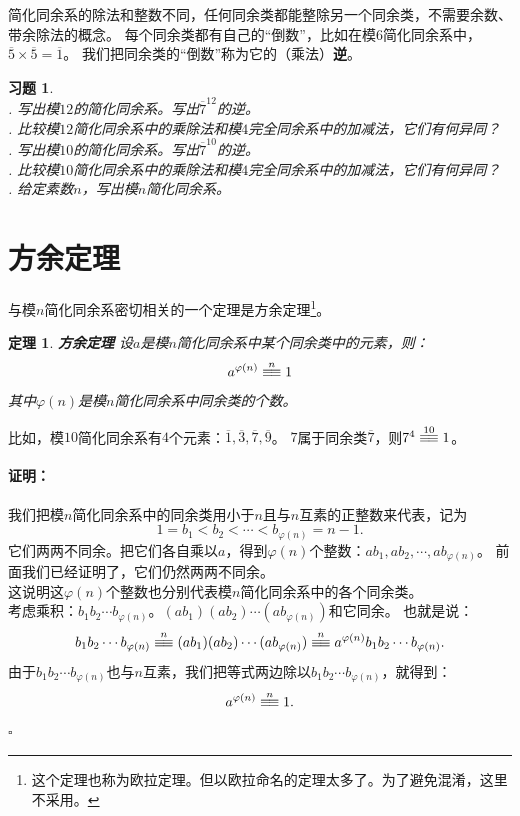 \documentclass[12pt,UTF8]{ctexbook}
\newtheorem{tm}{定理}[section]
\newtheorem{xt}{习题}[section]
\renewenvironment{proof}{\paragraph{\textbf{证明：}}}{\hfill$\square$}
\newcommand{\tong}[1]{\overset{#1}{\equiv\joinrel\equiv}}
\begin{document}
简化同余系的除法和整数不同，任何同余类都能整除另一个同余类，不需要余数、带余除法的概念。
每个同余类都有自己的“倒数”，比如在模$6$简化同余系中，$\overline{5}\times\overline{5} = \overline{1}$。
我们把同余类的“倒数”称为它的（乘法）\textbf{逆}。

\begin{xt}
    \mbox{}\\
    . 写出模$12$的简化同余系。写出$\overline{7}^{12}$的逆。\\
    . 比较模$12$简化同余系中的乘除法和模$4$完全同余系中的加减法，它们有何异同？\\
    . 写出模$10$的简化同余系。写出$\overline{7}^{10}$的逆。\\
    . 比较模$10$简化同余系中的乘除法和模$4$完全同余系中的加减法，它们有何异同？\\
    . 给定素数$n$，写出模$n$简化同余系。
\end{xt}

\section{方余定理}
与模$n$简化同余系密切相关的一个定理是方余定理\footnote{这个定理也称为欧拉定理。但以欧拉命名的定理太多了。为了避免混淆，这里不采用。}。
\begin{tm}{\textbf{方余定理} }\label{tm:3-3-0}
    设$a$是模$n$简化同余系中某个同余类中的元素，则：
    $$ a^{\varphi(n)} \tong{n} 1 $$
    其中$\varphi(n)$是模$n$简化同余系中同余类的个数。
\end{tm}
比如，模$10$简化同余系有$4$个元素：$\overline{1}, \overline{3},\overline{7},\overline{9}$。
$7$属于同余类$\overline{7}$，则$7^4 \tong{10} 1$。

\begin{proof}
    我们把模$n$简化同余系中的同余类用小于$n$且与$n$互素的正整数来代表，记为
    $$1 = b_1 < b_2 < \cdots < b_{\varphi(n)} = n-1.$$
    它们两两不同余。把它们各自乘以$a$，得到$\varphi(n)$个整数：$ab_1, ab_2, \cdots , ab_{\varphi(n)}$。
    前面我们已经证明了，它们仍然两两不同余。\\
    这说明这$\varphi(n)$个整数也分别代表模$n$简化同余系中的各个同余类。\\
    考虑乘积：$b_1 b_2 \cdots b_{\varphi(n)}$。$(ab_1) (ab_2) \cdots (ab_{\varphi(n)})$和它同余。
    也就是说：
    $$b_1 b_2 \cdots b_{\varphi(n)} \tong{n} (ab_1) (ab_2) \cdots (ab_{\varphi(n)}) \tong{n} a^{\varphi(n)} b_1 b_2 \cdots b_{\varphi(n)}.$$
    由于$b_1 b_2 \cdots b_{\varphi(n)}$也与$n$互素，我们把等式两边除以$b_1 b_2 \cdots b_{\varphi(n)}$，就得到：
    $$ a^{\varphi(n)} \tong{n} 1 . $$
\end{proof}
\end{document}
